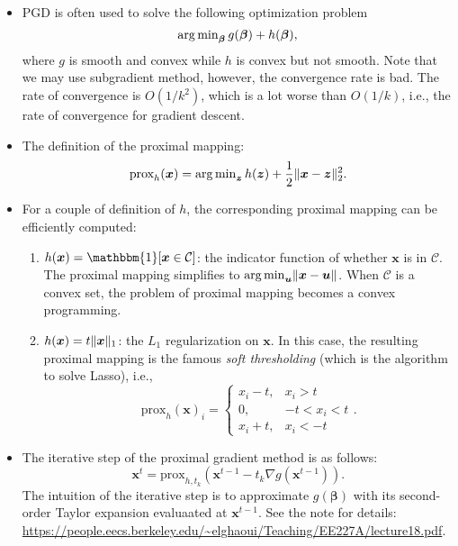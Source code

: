     \begin{itemize}
        \item PGD is often used to solve the following optimization problem
            \begin{equation}
                \operatorname{arg\,min}_{\bm{\beta}} g(\bm{\beta}) + h(\bm{\beta}),
            \end{equation}
        where $g$ is smooth and convex while $h$ is convex but not smooth.  
        Note that we may use subgradient method, however, the convergence rate is bad.
        The rate of convergence is $O(1/k^2)$, which is a lot worse than $O(1/k)$, i.e., the rate of convergence for gradient descent.
        \item The definition of the proximal mapping:
            \begin{equation}
                \text{prox}_h(\bm{x}) = \operatorname{arg\,min}_{\bm{z}} h(\bm{z}) + \frac{1}{2}\lVert\bm{x} - \bm{z}\rVert^2_2.
            \end{equation}
        \item For a couple of definition of $h$, the corresponding proximal mapping can be efficiently computed:
            \begin{enumerate}
                \item $h(\bm{x}) = \mathbbm{1}[\bm{x} \in \mathcal{C}]$: the indicator function of whether $\bm{x}$ is in $\mathcal{C}$. The proximal mapping simplifies to $\operatorname{arg\,min}_{\bm{u}}\lVert\bm{x} - \bm{u}\rVert$. When $\mathcal{C}$ is a convex set, the problem of proximal mapping becomes a convex programming.
                \item $h(\bm{x}) = t \lVert\bm{x}\rVert_1$: the $L_1$ regularization on $\bm{x}$. In this case, the resulting proximal mapping is the famous \emph{soft thresholding} (which is the algorithm to solve Lasso), i.e., 
                    \begin{equation}
                        \text{prox}_h(\bm{x})_i = \begin{cases}
                            x_i - t,&  x_i > t \\
                            0, & -t < x_i < t \\
                            x_i + t, & x_i < -t
                        \end{cases}.
                    \end{equation}
            \end{enumerate}
            
            
        \item The iterative step of the proximal gradient method is as follows:
            \begin{equation}
                    \bm{x}^t = \text{prox}_{h, t_k}\left( \bm{x}^{t-1} - t_k \nabla g(\bm{x}^{t-1}) \right).
            \end{equation}
        The intuition of the iterative step is to approximate $g(\bm{\beta})$ with its second-order Taylor expansion evaluaated at $\bm{x}^{t-1}$.
        See the note for details: \url{https://people.eecs.berkeley.edu/~elghaoui/Teaching/EE227A/lecture18.pdf}.
    \end{itemize}